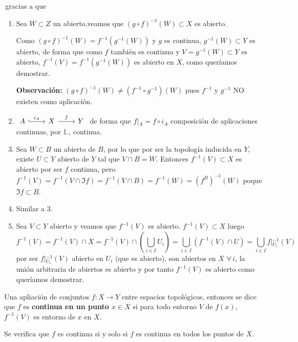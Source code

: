 \begin{dem}\,gracias a que  
    \begin{enumerate}
        \item Sea $W\subset Z$ un abierto,veamos que $(g\circ f)^{-1}(W) \subset X$ es abierto. 
        
        Como $(g\circ f)^{-1}(W) = f^{-1}(g^{-1}(W))$ y $g$ es continua, $g^{-1}(W) \subset Y$ es abierto, de forma que como $f$ tambi\'en es continua y $V = g^{-1}(W) \subset Y$ es abierto, $f^{-1}(V) = f^{-1}(g^{-1}(W))$ es abierto en $X$, como quer\'iamos demostrar. 
        
        \noindent \textbf{Observaci\'on:} $(g\circ f)^{-1}(W) \neq (f^{-1} \circ g^{-1})(W)$ pues $f^{-1}$ y $g^{-1}$ NO existen como aplicaci\'on. 

        \item $\bt A \rar[hook]{i_A} & X \rar{f} & Y \et$ de forma que $f\vert{}_A = f\circ i_A$ composici\'on de aplicaciones continuas, por 1., continua. 
        
        \item Sea $W \subset B$ un abierto de $B$, por lo que por ser la topolog\'ia inducida en $Y$, existe $U\subset Y$ abierto de $Y$ tal que $V \cap B = W$. Entonces $f^{-1}(V) \subset X$ es abierto por ser $f$ continua, pero $f^{-1}(V)  = f^{-1}(V \cap \Im f) = f^{-1}(V \cap B) = f^{-1}(W)=(f^B)^{-1}(W)$ poque $\Im f\subset B$.  
        \item Similar a 3.
        \item Sea $V\subset Y$ abierto y veamos que $f^{-1}(V)$ es abierto. $f^{-1}(V) \subset X$ luego
        $$f^{-1}(V) = f^{-1}(V) \cap X = f^{-1}(V) \cap \left( \bigcup_{i \in I} U_i \right) = \bigcup_{i\in I} \left(f^{-1}(V) \cap U \right) = \bigcup_{i \in I} f\vert{}_{U_i}^{-1}(V)$$
        por ser $f\vert{}_{U_i} ^{-1}(V)$ abierto en $U_i$ (que es abierto), son abiertos en $X$ $\forall \, i$, la uni\'on arbitraria de abiertos es abierto y por tanto $f^{-1}(V)$ es abierto como quer\'iamos demostrar. 
    \end{enumerate}
\end{dem}
\begin{defi}
    Una apliaci\'on de conjuntos $f : X\longrightarrow Y$ entre espacios topol\'ogicos, entonces se dice que $f$ es \textbf{continua en un punto $x\in X$} si para todo entorno $V$ de $f(x)$, $f^{-1}(V)$ es entorno de $x$ en $X$. 

    Se verifica que $f$ es continua si y solo si $f$ es continua en todos los puntos de $X$. 
\end{defi}
